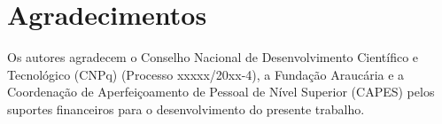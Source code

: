 \documentclass[journal, twoside]{IEEEtran}
\begin{document}
\lipsum[5-10]









      
      







%

\section*{Agradecimentos}

Os autores agradecem o Conselho Nacional de Desenvolvimento Científico e Tecnológico (CNPq) (Processo xxxxx/20xx-4), a Fundação Araucária e a Coordenação de Aperfeiçoamento de Pessoal de Nível Superior (CAPES) pelos suportes financeiros para o desenvolvimento do presente trabalho.







\ifCLASSOPTIONcaptionsoff
  \newpage
\fi
\end{document}
